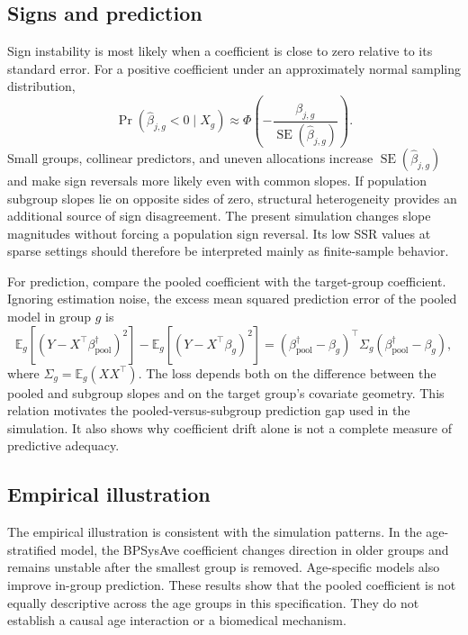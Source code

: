 \subsection{Signs and prediction}

Sign instability is most likely when a coefficient is close to zero relative to its standard error. For a positive coefficient under an approximately normal sampling distribution,
\[
\Pr\!\left(\hat{\beta}_{j,g}<0\mid X_g\right)
\approx \Phi\!\left(-\frac{\beta_{j,g}}{\operatorname{SE}(\hat{\beta}_{j,g})}\right).
\]
Small groups, collinear predictors, and uneven allocations increase $\operatorname{SE}(\hat{\beta}_{j,g})$ and make sign reversals more likely even with common slopes. If population subgroup slopes lie on opposite sides of zero, structural heterogeneity provides an additional source of sign disagreement. The present simulation changes slope magnitudes without forcing a population sign reversal. Its low SSR values at sparse settings should therefore be interpreted mainly as finite-sample behavior.

For prediction, compare the pooled coefficient with the target-group coefficient. Ignoring estimation noise, the excess mean squared prediction error of the pooled model in group $g$ is
\[
\mathbb{E}_g\!\left[(Y - X^{\top}\beta_{\mathrm{pool}}^{\dagger})^2\right]
- \mathbb{E}_g\!\left[(Y - X^{\top}\beta_g)^2\right]
= (\beta_{\mathrm{pool}}^{\dagger}-\beta_g)^{\top}\Sigma_g(\beta_{\mathrm{pool}}^{\dagger}-\beta_g),
\]
where $\Sigma_g = \mathbb{E}_g(XX^{\top})$. The loss depends both on the difference between the pooled and subgroup slopes and on the target group’s covariate geometry. This relation motivates the pooled-versus-subgroup prediction gap used in the simulation. It also shows why coefficient drift alone is not a complete measure of predictive adequacy.

\subsection{Empirical illustration}

The empirical illustration is consistent with the simulation patterns. In the age-stratified model, the BPSysAve coefficient changes direction in older groups and remains unstable after the smallest group is removed. Age-specific models also improve in-group prediction. These results show that the pooled coefficient is not equally descriptive across the age groups in this specification. They do not establish a causal age interaction or a biomedical mechanism.

